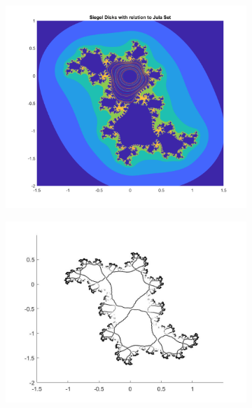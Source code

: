 \documentclass{article}
\theoremstyle{plain}
\theoremstyle{remark}
\begin{document}
\noindent
\begin{figure}[h!]
\begin{subfigure}{.5\textwidth}
\includegraphics[scale=.35]{siegel_julia_combined}
\end{subfigure}
\begin{subfigure}{.5\textwidth}
\includegraphics[scale=.27]{preimage_julia_set}
\end{subfigure}
\end{figure}
\end{document}
